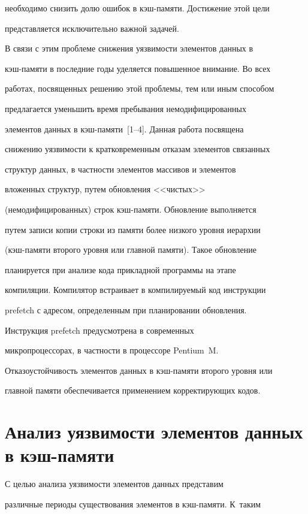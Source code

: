 необходимо снизить долю ошибок в кэш-памяти. Достижение этой цели 

представляется исключительно важной задачей. 

    

    В связи с этим проблеме снижения уязвимости элементов данных в 

кэш-па\-мя\-ти в последние годы уделяется повышенное внимание. Во всех 

работах, посвященных решению этой проблемы, тем или иным способом 

предлагается уменьшить время пребывания немодифицированных 

элементов данных в кэш-па\-мя\-ти~[1--4]. Данная работа посвящена 

снижению уязвимости к кратковременным отказам элементов связанных 

структур данных, в частности элементов массивов и элементов 

вложенных структур, путем обновления <<чистых>> 

(немодифицированных) строк кэш-памяти. Обновление выполняется 

путем записи копии строки из памяти более низкого уровня иерархии 

(кэш-па\-мя\-ти второго уровня или главной памяти). Такое обновление 

планируется при анализе кода прикладной программы на этапе 

компиляции. Компилятор встраивает в компилируемый код инструкции 

{prefetch} с адресом, определенным при планировании обновления. 

Инструкция {prefetch} предусмотрена в современных 

микропроцессорах, в частности в процессоре Pentium~M. 

Отказоустойчивость элементов данных в кэш-памяти второго уровня или 

главной памяти обеспечивается применением корректирующих кодов. 

    

    \section{Анализ уязвимости элементов данных в кэш-памяти}

    С целью анализа уязвимости элементов данных представим 

различные периоды существования элементов в кэш-памяти. К~таким 

